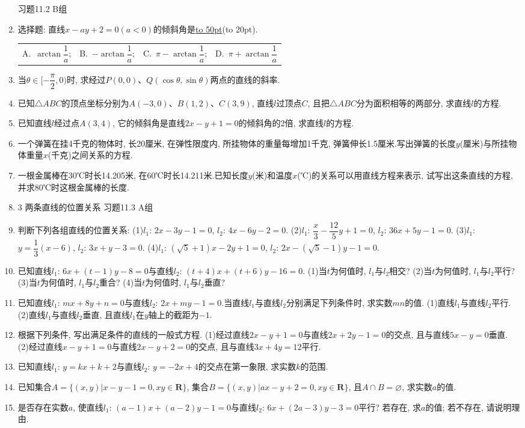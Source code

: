 \documentclass[10pt,a4paper]{article}
\newcommand{\blank}[1]{\underline{\hbox to #1pt{}}}
\newcommand{\bracket}[1]{(\hbox to #1pt{})}
\newcommand{\fourch}[4]{\par\begin{tabular}{p{.23\textwidth}p{.23\textwidth}p{.23\textwidth}p{.23\textwidth}}
A.~#1 &B.~#2& C.~#3& D.~#4
\end{tabular}}
\begin{document}
\begin{enumerate}[1.]
习题11.2  B组
\item 选择题:
直线$x-ay+2=0(a<0)$的倾斜角是\blank{50}\bracket{20}.
\fourch{$\arctan \dfrac 1a$;}{$-\arctan \dfrac 1a$;}{$\pi -\arctan \dfrac 1a$;}{$\pi +\arctan \dfrac 1a$}
\item 当$\theta \in [-\dfrac{\pi }2,0)$时, 求经过$P(0,0)$、$Q(\cos \theta ,\sin \theta)$两点的直线的斜率.
\item 已知$\triangle ABC$的顶点坐标分别为$A(-3,0)$、$B(1,2)$、$C(3,9)$, 直线$l$过顶点$C$, 且把$\triangle ABC$分为面积相等的两部分, 求直线$l$的方程.
\item 已知直线$l$经过点$A(3,4)$, 它的倾斜角是直线$2x-y+1=0$的倾斜角的2倍, 求直线$l$的方程.
\item 一个弹簧在挂4千克的物体时, 长20厘米, 在弹性限度内, 所挂物体的重量每增加1千克, 弹簧伸长1.5厘米.写出弹簧的长度$y$(厘米)与所挂物体重量$x$(千克)之间关系的方程.
\item 一根金属棒在30℃时长14.205米, 在60℃时长14.211米.已知长度$y$(米)和温度$x$(℃)的关系可以用直线方程来表示, 试写出这条直线的方程, 并求80℃时这根金属棒的长度.
\item 3  两条直线的位置关系
习题11.3  A组
\item 判断下列各组直线的位置关系:
(1)$l_1$: $2x-3y-1=0$, $l_2$: $4x-6y-2=0$.
(2)$l_1$: $\dfrac x3-\dfrac{12}5y+1=0$, $l_2$: $36x+5y-1=0$.
(3)$l_1$: $y=\dfrac 13(x-6)$, $l_2$: $3x+y-3=0$.
(4)$l_1$: $(\sqrt 5+1)x-2y+1=0$, $l_2$: $2x-(\sqrt 5-1)y-1=0$.
\item 已知直线$l_1$: $6x+(t-1)y-8=0$与直线$l_2$: $(t+4)x+(t+6)y-16=0$.
(1)当$t$为何值时, $l_1$与$l_2$相交?
(2)当$t$为何值时, $l_1$与$l_2$平行?
(3)当$t$为何值时, $l_1$与$l_2$重合?
(4)当$t$为何值时, $l_1$与$l_2$垂直?
\item 已知直线$l_1$: $mx+8y+n=0$与直线$l_2$: $2x+my-1=0$.当直线$l_1$与直线$l_2$分别满足下列条件时, 求实数$mn$的值.
(1)直线$l_1$与直线$l_2$平行.
(2)直线$l_1$与直线$l_2$垂直, 且直线$l_1$在$y$轴上的截距为$-1$.
\item 根据下列条件, 写出满足条件的直线的一般式方程.
(1)经过直线$2x-y+1=0$与直线$2x+2y-1=0$的交点, 且与直线$5x-y=0$垂直.
(2)经过直线$x-y+1=0$与直线$2x-y+2=0$的交点, 且与直线$3x+4y=12$平行.
\item 已知直线$l_1$: $y=kx+k+2$与直线$l_2$: $y=-2x+4$的交点在第一象限, 求实数$k$的范围.
\item 已知集合$A=\{(x,y)|x-y-1=0,xy\in \mathbf{R}\}$, 集合$B=\{(x,y)|ax-y+2=0,xy\in \mathbf{R}\}$, 且$A\cap B=\varnothing$, 求实数$a$的值.
\item 是否存在实数$a$, 使直线$l_1$: $(a-1)x+(a-2)y-1=0$与直线$l_2$: $6x+(2a-3)y-3=0$平行? 若存在, 求$a$的值; 若不存在, 请说明理由.

\end{enumerate}
\end{document}
